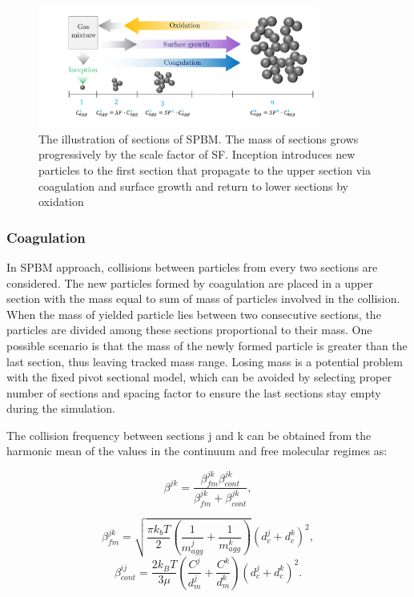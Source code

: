 \begin{figure}[!htbp]
	\centering
	\includegraphics[height=40mm, ]{Figures/Theory/Sectional.pdf}
	\caption{The illustration of sections of SPBM. The mass of sections grows progressively by the scale factor of SF. Inception introduces new particles to the first section that propagate to the upper section via coagulation and surface growth and return to lower sections by oxidation}
	\label{fig:sectional}
\end{figure}

\subsubsection{Coagulation}
\label{sec:sectcoag}
In SPBM approach, collisions between particles from every two sections are considered. The new particles formed by coagulation are placed in a upper section with the mass equal to sum of mass of particles involved in the collision. When the mass of yielded particle lies between two consecutive sections, the particles are divided among these sections proportional to their mass. One possible scenario is that the mass of the newly formed particle is greater than the last section, thus leaving tracked mass range. Losing mass is a potential problem with the fixed pivot sectional model, which can be avoided by selecting proper number of sections and spacing factor to ensure the last sections stay empty during the simulation.

The collision frequency between sections j and k can be obtained from the harmonic mean of the values in the continuum and free molecular regimes as:

\begin{equation}
	\beta^{jk} = 				       \frac{\beta^{jk}_{fm}\beta^{jk}_{cont}}{\beta^{jk}_{fm}
		+\beta^{jk}_{cont}}
	\label{eqn:betahmsect},
\end{equation}

\begin{equation}
	\beta^{jk}_{fm} =
	\sqrt{
		\frac{\pi k_b T}{2}
		\left(
			\frac{1}{m^j_{agg}}+
			\frac{1}{m^k_{agg}}
		\right)
	} 
	\left(
		d^j_c+d^k_c
	\right)^2
	\label{eqn:betafmsect},
\end{equation}
\begin{equation}
	\beta^{ij}_{cont} = \frac{2k_BT}{3\mu}
	\left(
		\frac{C^j}{d^j_m}+
		\frac{C^k}{d^k_m}
	\right)
	\left(
		d^j_c+d^k_c
	\right)^2
	\label{eqn:betacontsect}.
\end{equation}


